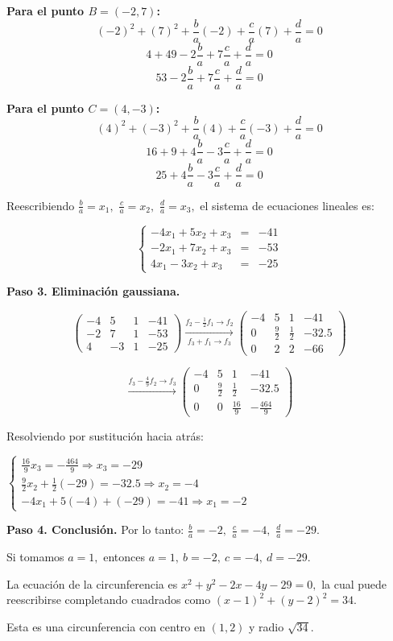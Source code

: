 \begin{prob}
\begin{myproof}
\textbf{Para el punto $B = (-2, 7)$:}
$$(-2)^2 + (7)^2 + \frac{b}{a}(-2) + \frac{c}{a}(7) + \frac{d}{a} = 0$$
$$4 + 49 - 2\frac{b}{a} + 7\frac{c}{a} + \frac{d}{a} = 0$$
$$53 - 2\frac{b}{a} + 7\frac{c}{a} + \frac{d}{a} = 0$$

\textbf{Para el punto $C = (4, -3)$:}
$$(4)^2 + (-3)^2 + \frac{b}{a}(4) + \frac{c}{a}(-3) + \frac{d}{a} = 0$$
$$16 + 9 + 4\frac{b}{a} - 3\frac{c}{a} + \frac{d}{a} = 0$$
$$25 + 4\frac{b}{a} - 3\frac{c}{a} + \frac{d}{a} = 0$$

Reescribiendo $\frac{b}{a}=x_1,$ $\frac{c}{a}=x_2,$ $\frac{d}{a}=x_3,$ el sistema de ecuaciones lineales es:

$$\left\lbrace \begin{array}{rcl}
-4x_1 + 5x_2 + x_3 &=& -41\\
-2x_1 + 7x_2 + x_3 &=& -53\\
4x_1 - 3x_2 + x_3 &=& -25
\end{array} \right.$$

\textbf{Paso 3. Eliminación gaussiana.}

$$\left( \begin{array}{ccc|c}
-4&5&1&-41\\
-2&7&1&-53\\
4&-3&1&-25
\end{array}\right) \xrightarrow[\text{$f_3 + f_1\to f_3$}]{\text{$f_2 - \frac{1}{2}f_1\to f_2$}} \left( \begin{array}{ccc|c}
-4&5&1&-41\\
0&\frac{9}{2}&\frac{1}{2}&-32.5\\
0&2&2&-66
\end{array}\right)$$

$$\xrightarrow{\text{$f_3 - \frac{4}{9}f_2\to f_3$}} \left( \begin{array}{ccc|c}
-4&5&1&-41\\
0&\frac{9}{2}&\frac{1}{2}&-32.5\\
0&0&\frac{16}{9}&-\frac{464}{9}
\end{array}\right)$$

Resolviendo por sustitución hacia atrás:


$\begin{cases}
\frac{16}{9}x_3 = -\frac{464}{9} \Rightarrow x_3 = -29\\
\frac{9}{2}x_2 + \frac{1}{2}(-29) = -32.5 \Rightarrow x_2 = -4\\
-4x_1 + 5(-4) + (-29) = -41 \Rightarrow x_1 = -2
\end{cases}$

\textbf{Paso 4. Conclusión.} Por lo tanto: $\frac{b}{a} = -2,$ $\frac{c}{a} = -4,$ $\frac{d}{a} = -29.$

Si tomamos $a = 1,$ entonces $\boxed{a=1,\ b = -2,\ c = -4,\ d = -29}.$

La ecuación de la circunferencia es $x^2+y^2-2x-4y-29=0,$ la cual puede reescribirse completando cuadrados como $(x - 1)^2 + (y - 2)^2 = 34.$

Esta es una circunferencia con centro en $(1, 2)$ y radio $\sqrt{34}.$

\end{myproof}

\end{prob}

